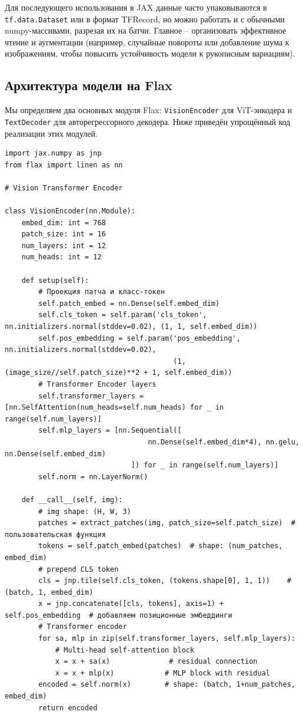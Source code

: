\documentclass{article}
\begin{document}
Для последующего использования в JAX данные часто упаковываются в \texttt{tf.data.Dataset} или в формат TFRecord, но можно работать и с обычными numpy-массивами, разрезая их на батчи. Главное – организовать эффективное чтение и аугментации (например, случайные повороты или добавление шума к изображениям, чтобы повысить устойчивость модели к рукописным вариациям).

\subsection{Архитектура модели на Flax}

Мы определяем два основных модуля Flax: \texttt{VisionEncoder} для ViT-энкодера и \texttt{TextDecoder} для авторегрессорного декодера. Ниже приведён упрощённый код реализации этих модулей.

\begin{lstlisting}
import jax.numpy as jnp
from flax import linen as nn

# Vision Transformer Encoder

class VisionEncoder(nn.Module):
    embed_dim: int = 768
    patch_size: int = 16
    num_layers: int = 12
    num_heads: int = 12

    def setup(self):
        # Проекция патча и класс-токен
        self.patch_embed = nn.Dense(self.embed_dim)
        self.cls_token = self.param('cls_token', nn.initializers.normal(stddev=0.02), (1, 1, self.embed_dim))
        self.pos_embedding = self.param('pos_embedding', nn.initializers.normal(stddev=0.02),
                                        (1, (image_size//self.patch_size)**2 + 1, self.embed_dim))
        # Transformer Encoder layers
        self.transformer_layers = [nn.SelfAttention(num_heads=self.num_heads) for _ in range(self.num_layers)]
        self.mlp_layers = [nn.Sequential([
                                  nn.Dense(self.embed_dim*4), nn.gelu, nn.Dense(self.embed_dim)
                              ]) for _ in range(self.num_layers)]
        self.norm = nn.LayerNorm()

    def __call__(self, img):
        # img shape: (H, W, 3)
        patches = extract_patches(img, patch_size=self.patch_size)  # пользовательская функция
        tokens = self.patch_embed(patches)  # shape: (num_patches, embed_dim)
        # prepend CLS token
        cls = jnp.tile(self.cls_token, (tokens.shape[0], 1, 1))    # (batch, 1, embed_dim)
        x = jnp.concatenate([cls, tokens], axis=1) + self.pos_embedding  # добавляем позиционные эмбеддинги
        # Transformer encoder
        for sa, mlp in zip(self.transformer_layers, self.mlp_layers):
            # Multi-head self-attention block
            x = x + sa(x)              # residual connection
            x = x + mlp(x)            # MLP block with residual
        encoded = self.norm(x)        # shape: (batch, 1+num_patches, embed_dim)
        return encoded
\end{lstlisting}
\end{document}
